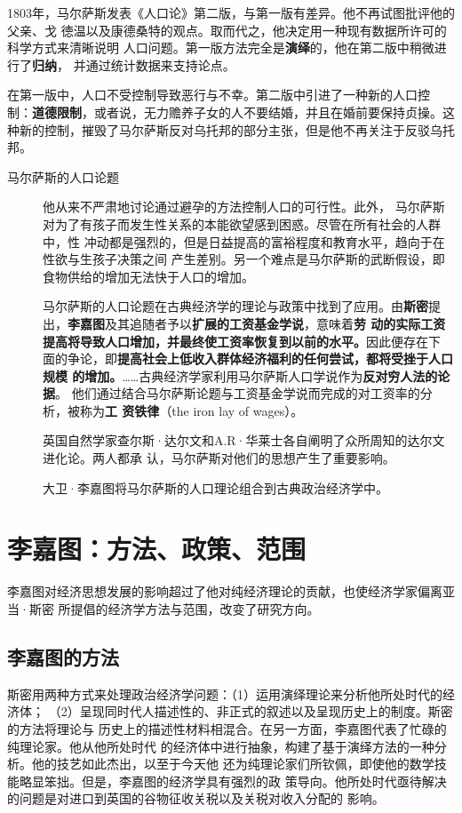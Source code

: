 1803年，马尔萨斯发表《人口论》第二版，与第一版有差异。他不再试图批评他的父亲、戈
徳温以及康德桑特的观点。取而代之，他决定用一种现有数据所许可的科学方式来清晰说明
人口问题。第一版方法完全是\textbf{演绎}的，他在第二版中稍微进行了\textbf{归纳}，
并通过统计数据来支持论点。

在第一版中，人口不受控制导致恶行与不幸。第二版中引进了一种新的人口控
制：\textbf{道德限制}，或者说，无力赡养子女的人不要结婚，并且在婚前要保持贞操。这
种新的控制，摧毁了马尔萨斯反对乌托邦的部分主张，但是他不再关注于反驳乌托邦。

\begin{description}
\item[马尔萨斯的人口论题] 他从来不严肃地讨论通过避孕的方法控制人口的可行性。此外，
  马尔萨斯对为了有孩子而发生性关系的本能欲望感到困惑。尽管在所有社会的人群中，性
  冲动都是强烈的，但是日益提高的富裕程度和教育水平，趋向于在性欲与生孩子决策之间
  产生差别。另一个难点是马尔萨斯的武断假设，即食物供给的增加无法快于人口的增加。

  马尔萨斯的人口论题在古典经济学的理论与政策中找到了应用。由\textbf{斯密}提
  出，\textbf{李嘉图}及其追随者予以\textbf{扩展的工资基金学说}，意味着\textbf{劳
    动的实际工资提高将导致人口增加，并最终使工资率恢复到以前的水平。}因此便存在下
  面的争论，即\textbf{提高社会上低收入群体经济福利的任何尝试，都将受挫于人口规模
    的增加。}……古典经济学家利用马尔萨斯人口学说作为\textbf{反对穷人法的论据}。
  他们通过结合马尔萨斯论题与工资基金学说而完成的对工资率的分析，被称为\textbf{工
    资铁律}（the iron lay of wages）。

  英国自然学家查尔斯·达尔文和A.R·华莱士各自阐明了众所周知的达尔文进化论。两人都承
  认，马尔萨斯对他们的思想产生了重要影响。

  大卫·李嘉图将马尔萨斯的人口理论组合到古典政治经济学中。
\end{description}

\section{李嘉图：方法、政策、范围}

李嘉图对经济思想发展的影响超过了他对纯经济理论的贡献，也使经济学家偏离亚当·斯密
所提倡的经济学方法与范围，改变了研究方向。

\subsection{李嘉图的方法}

斯密用两种方式来处理政治经济学问题：（1）运用演绎理论来分析他所处时代的经济体；
（2）呈现同时代人描述性的、非正式的叙述以及呈现历史上的制度。斯密的方法将理论与
历史上的描述性材料相混合。在另一方面，李嘉图代表了忙碌的纯理论家。他从他所处时代
的经济体中进行抽象，构建了基于演绎方法的一种分析。他的技艺如此杰出，以至于今天他
还为纯理论家们所钦佩，即使他的数学技能略显笨拙。但是，李嘉图的经济学具有强烈的政
策导向。他所处时代亟待解决的问题是对进口到英国的谷物征收关税以及关税对收入分配的
影响。

